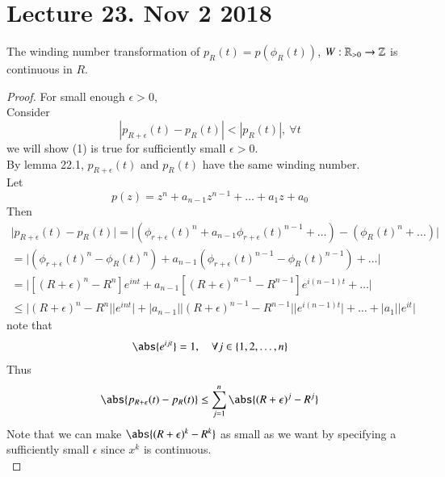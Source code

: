 \documentclass[10pt]{article}
\begin{document}
	\section{Lecture 23. Nov 2 2018}
		\begin{proposition}
			The winding number transformation of $p_R(t) = p(\phi_R(t))$, $W: \mathbb{R}_{> 0} \to \mathbb{Z}$ is continuous in $R$.
		\end{proposition}
		\begin{proof}
			For small enough $\epsilon > 0$, \\
			Consider 
			\begin{equation}
				|p_{R + \epsilon}(t) - p_R(t)| < |p_R(t)|,\ \forall t
			\end{equation}
			we will show (1) is true for sufficiently small $\epsilon > 0$. \\
			By lemma 22.1, $p_{R+\epsilon}(t)$ and $p_R(t)$ have the same winding number. \\
			Let 
			\begin{equation}
				p(z) = z^n + a_{n-1}z^{n-1} + \dots + a_1 z + a_0
			\end{equation}
			Then 
			\begin{gather}
				\big| p_{R+\epsilon}(t) - p_R(t) \big| = \big| (\phi_{r+\epsilon}(t)^n + a_{n-1}\phi_{r+\epsilon}(t)^{n-1} + \dots) - (\phi_{R}(t)^n + \dots) \big| \\
				= \big| (\phi_{r+\epsilon}(t)^n - \phi_R(t)^n) + a_{n-1}(\phi_{r+\epsilon}(t)^{n-1} - \phi_R(t)^{n-1}) + \dots \big| \\
				= \big| [(R+\epsilon)^n - R^n] e^{int} + a_{n-1} [(R+\epsilon)^{n-1} - R^{n-1}] e^{i(n-1)t} + \dots \big| \\
				\leq \big| (R+\epsilon)^n - R^n \big | \big |e^{int} \big| + \big| a_{n-1} \big| \big | (R+\epsilon)^{n-1} - R^{n-1} \big | \big | e^{i(n-1)t} \big | + \dots + \big |a_1 \big| \big |e^{it} \big |
			\end{gather}
			note that
			\begin{equation}
				\abs{e^{ijt}} = 1,\quad \forall j \in \{1, 2, \dots, n\}
			\end{equation}
			Thus
			\begin{gather}
				\abs{p_{R+\epsilon}(t) - p_R(t)} \leq \sum_{j=1}^n \abs{(R + \epsilon)^j - R^j}
			\end{gather}
			Note that we can make $\abs{(R+\epsilon)^k - R^k}$ as small as we want by specifying a sufficiently small $\epsilon$ since $x^k$ is continuous. \\
		\end{proof}
		
\end{document}

